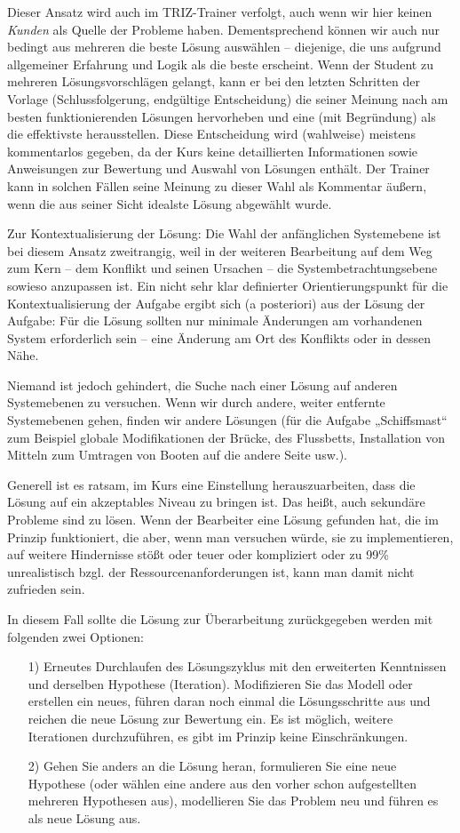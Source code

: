 \documentclass[11pt,a4paper]{article}
\begin{document}
Dieser Ansatz wird auch im TRIZ-Trainer verfolgt, auch wenn wir hier keinen
\emph{Kunden} als Quelle der Probleme haben. Dementsprechend können wir auch
nur bedingt aus mehreren die beste Lösung auswählen -- diejenige, die uns
aufgrund allgemeiner Erfahrung und Logik als die beste erscheint. Wenn der
Student zu mehreren Lösungsvorschlägen gelangt, kann er bei den letzten
Schritten der Vorlage (Schlussfolgerung, endgültige Entscheidung) die seiner
Meinung nach am besten funktionierenden Lösungen hervorheben und eine (mit
Begründung) als die effektivste herausstellen. Diese Entscheidung wird
(wahlweise) meistens kommentarlos gegeben, da der Kurs keine detaillierten
Informationen sowie Anweisungen zur Bewertung und Auswahl von Lösungen
enthält. Der Trainer kann in solchen Fällen seine Meinung zu dieser Wahl als
Kommentar äußern, wenn die aus seiner Sicht idealste Lösung abgewählt wurde.
 
Zur Kontextualisierung der Lösung: Die Wahl der anfänglichen Systemebene ist
bei diesem Ansatz zweitrangig, weil in der weiteren Bearbeitung auf dem Weg
zum Kern -- dem Konflikt und seinen Ursachen -- die Systembetrachtungsebene
sowieso anzupassen ist. Ein nicht sehr klar definierter Orientierungspunkt für
die Kontextualisierung der Aufgabe ergibt sich (a posteriori) aus der Lösung
der Aufgabe: Für die Lösung sollten nur minimale Änderungen am vorhandenen
System erforderlich sein -- eine Änderung am Ort des Konflikts oder in dessen
Nähe.

Niemand ist jedoch gehindert, die Suche nach einer Lösung auf anderen
Systemebenen zu versuchen. Wenn wir durch andere, weiter entfernte
Systemebenen gehen, finden wir andere Lösungen (für die Aufgabe „Schiffsmast“
zum Beispiel globale Modifikationen der Brücke, des Flussbetts, Installation
von Mitteln zum Umtragen von Booten auf die andere Seite usw.).

Generell ist es ratsam, im Kurs eine Einstellung herauszuarbeiten, dass die
Lösung auf ein akzeptables Niveau zu bringen ist. Das heißt, auch sekundäre
Probleme sind zu lösen.  Wenn der Bearbeiter eine Lösung gefunden hat, die im
Prinzip funktioniert, die aber, wenn man versuchen würde, sie zu
implementieren, auf weitere Hindernisse stößt oder teuer oder kompliziert oder
zu 99\% unrealistisch bzgl. der Ressourcenanforderungen ist, kann man damit
nicht zufrieden sein.

In diesem Fall sollte die Lösung zur Überarbeitung zurückgegeben werden mit
folgenden zwei Optionen:
\begin{itemize}
\item [1)] Erneutes Durchlaufen des Lösungszyklus mit den erweiterten
  Kenntnissen und derselben Hypothese (Iteration).  Modifizieren Sie das
  Modell oder erstellen ein neues, führen daran noch einmal die
  Lösungsschritte aus und reichen die neue Lösung zur Bewertung ein. Es ist
  möglich, weitere Iterationen durchzuführen, es gibt im Prinzip keine
  Einschränkungen.
\enlargethispage{-1em}
\item [2)] Gehen Sie anders an die Lösung heran, formulieren Sie eine neue
  Hypothese (oder wählen eine andere aus den vorher schon aufgestellten
  mehreren Hypothesen aus), modellieren Sie das Problem neu und führen es als
  neue Lösung aus.
\end{itemize}
\end{document}
